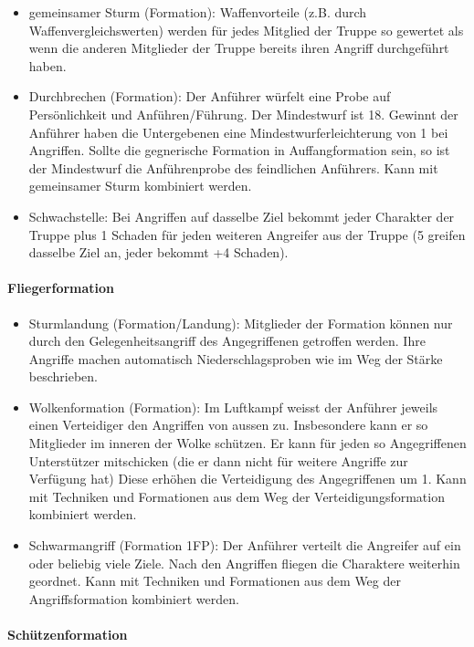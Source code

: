 \documentclass{article}
\begin{document}
\begin{itemize}
\item gemeinsamer Sturm (Formation): Waffenvorteile (z.B. durch Waffenvergleichswerten) werden für jedes Mitglied der Truppe so gewertet als wenn die anderen Mitglieder der Truppe bereits ihren Angriff durchgeführt haben.
\item Durchbrechen (Formation): Der Anführer würfelt eine Probe auf Persönlichkeit und Anführen/Führung. Der Mindestwurf ist 18. Gewinnt der Anführer haben die Untergebenen eine Mindestwurferleichterung von 1 bei Angriffen. Sollte die gegnerische Formation in Auffangformation sein, so ist der Mindestwurf die Anführenprobe des feindlichen Anführers. Kann mit gemeinsamer Sturm kombiniert werden.
\item Schwachstelle: Bei Angriffen auf dasselbe Ziel bekommt jeder Charakter der Truppe plus 1 Schaden für jeden weiteren Angreifer aus der Truppe (5 greifen dasselbe Ziel an, jeder bekommt +4 Schaden).
\end{itemize}

\paragraph{Fliegerformation}

\begin{itemize}
\item Sturmlandung (Formation/Landung): Mitglieder der Formation können nur durch den Gelegenheitsangriff des Angegriffenen getroffen werden. Ihre Angriffe machen automatisch Niederschlagsproben wie im Weg der Stärke beschrieben.
\item Wolkenformation (Formation): Im Luftkampf weisst der Anführer jeweils einen Verteidiger den Angriffen von aussen zu. Insbesondere kann er so Mitglieder im inneren der Wolke schützen. Er kann für jeden so Angegriffenen Unterstützer mitschicken (die er dann nicht für weitere Angriffe zur Verfügung hat) Diese erhöhen die Verteidigung des Angegriffenen um 1. Kann mit Techniken und Formationen aus dem Weg der Verteidigungsformation kombiniert werden.
\item Schwarmangriff (Formation 1FP): Der Anführer verteilt die Angreifer auf ein oder beliebig viele Ziele. Nach den Angriffen fliegen die Charaktere weiterhin geordnet. Kann mit Techniken und Formationen aus dem Weg der Angriffsformation kombiniert werden.
\end{itemize}

\paragraph{Schützenformation}
\end{document}

